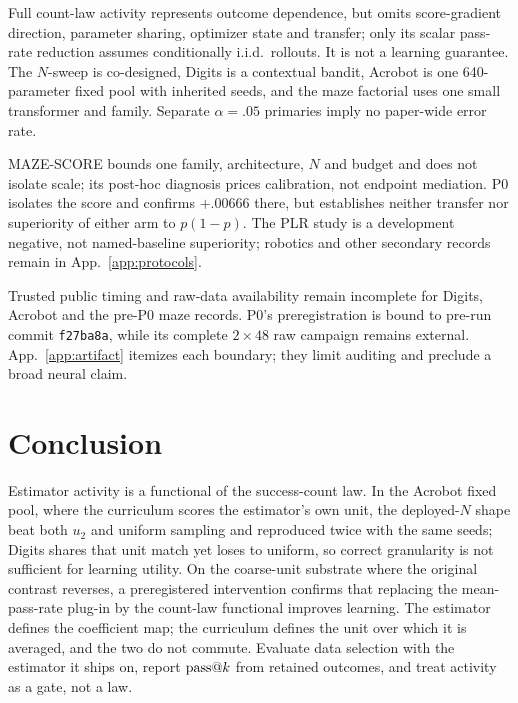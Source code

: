 Full count-law activity represents outcome dependence, but omits
score-gradient direction, parameter sharing, optimizer state and transfer;
only its scalar pass-rate reduction assumes conditionally i.i.d.\ rollouts.
It is not a learning guarantee. The $N$-sweep is co-designed, Digits is a contextual bandit,
Acrobot is one 640-parameter fixed pool with inherited seeds, and the maze
factorial uses one small transformer and family. Separate $\alpha=.05$
primaries imply no paper-wide error rate.

MAZE-SCORE bounds one family, architecture, $N$ and budget and does not isolate
scale; its post-hoc diagnosis prices calibration, not endpoint mediation. P0
isolates the score and confirms $+.00666$ there, but establishes neither
transfer nor superiority of either arm to $p(1-p)$. The PLR study is a
development negative, not named-baseline superiority; robotics and other
secondary records remain in App.~\ref{app:protocols}.

Trusted public timing and raw-data availability remain incomplete for Digits,
Acrobot and the pre-P0 maze records. P0's preregistration is bound to pre-run
commit \texttt{f27ba8a}, while its complete $2\times48$ raw campaign remains
external. App.~\ref{app:artifact} itemizes each boundary; they limit auditing
and preclude a broad neural claim.

\section{Conclusion}

Estimator activity is a functional of the success-count law. In the Acrobot
fixed pool, where the curriculum scores the estimator's own unit, the
deployed-$N$ shape beat both $u_2$ and uniform sampling and reproduced twice
with the same seeds; Digits shares that unit match yet loses to uniform, so
correct granularity is not sufficient for learning utility. On the coarse-unit substrate where
the original contrast reverses, a preregistered intervention confirms that
replacing the mean-pass-rate plug-in by the count-law functional improves
learning. The estimator defines the coefficient map; the curriculum defines
the unit over which it is averaged, and the two do not commute.
Evaluate data selection with the estimator it ships on, report $\text{pass@}k$
from retained outcomes, and treat activity as a gate, not a law.

